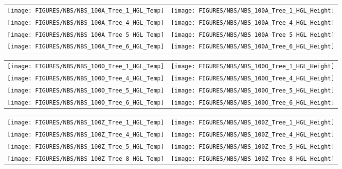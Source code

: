 \begin{figure}[p]
\begin{tabular*}{\textwidth}{l@{\extracolsep{\fill}}r}
\texttt{[image: FIGURES/NBS/NBS\_100A\_Tree\_1\_HGL\_Temp]} &
\texttt{[image: FIGURES/NBS/NBS\_100A\_Tree\_1\_HGL\_Height]} \\
\texttt{[image: FIGURES/NBS/NBS\_100A\_Tree\_4\_HGL\_Temp]} &
\texttt{[image: FIGURES/NBS/NBS\_100A\_Tree\_4\_HGL\_Height]} \\
\texttt{[image: FIGURES/NBS/NBS\_100A\_Tree\_5\_HGL\_Temp]} &
\texttt{[image: FIGURES/NBS/NBS\_100A\_Tree\_5\_HGL\_Height]} \\
\texttt{[image: FIGURES/NBS/NBS\_100A\_Tree\_6\_HGL\_Temp]} &
\texttt{[image: FIGURES/NBS/NBS\_100A\_Tree\_6\_HGL\_Height]}
\end{tabular*}
\end{figure}

\begin{figure}[p]
\begin{tabular*}{\textwidth}{l@{\extracolsep{\fill}}r}
\texttt{[image: FIGURES/NBS/NBS\_100O\_Tree\_1\_HGL\_Temp]} &
\texttt{[image: FIGURES/NBS/NBS\_100O\_Tree\_1\_HGL\_Height]} \\
\texttt{[image: FIGURES/NBS/NBS\_100O\_Tree\_4\_HGL\_Temp]} &
\texttt{[image: FIGURES/NBS/NBS\_100O\_Tree\_4\_HGL\_Height]} \\
\texttt{[image: FIGURES/NBS/NBS\_100O\_Tree\_5\_HGL\_Temp]} &
\texttt{[image: FIGURES/NBS/NBS\_100O\_Tree\_5\_HGL\_Height]} \\
\texttt{[image: FIGURES/NBS/NBS\_100O\_Tree\_6\_HGL\_Temp]} &
\texttt{[image: FIGURES/NBS/NBS\_100O\_Tree\_6\_HGL\_Height]}
\end{tabular*}
\end{figure}

\begin{figure}[p]
\begin{tabular*}{\textwidth}{l@{\extracolsep{\fill}}r}
\texttt{[image: FIGURES/NBS/NBS\_100Z\_Tree\_1\_HGL\_Temp]} &
\texttt{[image: FIGURES/NBS/NBS\_100Z\_Tree\_1\_HGL\_Height]} \\
\texttt{[image: FIGURES/NBS/NBS\_100Z\_Tree\_4\_HGL\_Temp]} &
\texttt{[image: FIGURES/NBS/NBS\_100Z\_Tree\_4\_HGL\_Height]} \\
\texttt{[image: FIGURES/NBS/NBS\_100Z\_Tree\_5\_HGL\_Temp]} &
\texttt{[image: FIGURES/NBS/NBS\_100Z\_Tree\_5\_HGL\_Height]} \\
\texttt{[image: FIGURES/NBS/NBS\_100Z\_Tree\_8\_HGL\_Temp]} &
\texttt{[image: FIGURES/NBS/NBS\_100Z\_Tree\_8\_HGL\_Height]}
\end{tabular*}
\end{figure}

